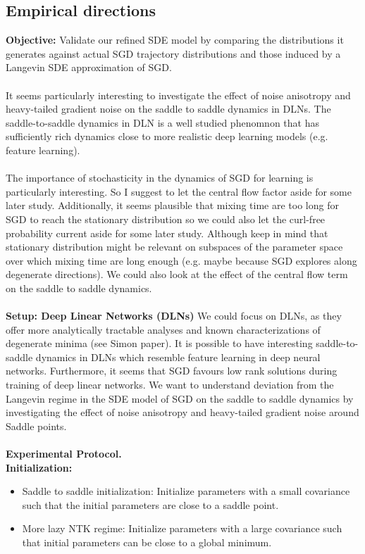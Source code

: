 \documentclass[11pt]{article}
\begin{document}
\subsection*{Empirical directions}
\textbf{Objective:} Validate our refined SDE model by comparing the distributions it generates against actual SGD trajectory distributions and those induced by a Langevin SDE approximation of SGD.
\\
\\
It seems particularly interesting to investigate the effect of noise anisotropy and heavy-tailed gradient noise on the saddle to saddle dynamics in DLNs. The saddle-to-saddle dynamics in DLN is a well studied phenomnon that has sufficiently rich dynamics close to more realistic deep learning models (e.g. feature learning).
\\
\\
The importance of stochasticity in the dynamics of SGD for learning is particularly interesting. So I suggest to let the central flow factor aside for some later study. Additionally, it seems plausible that mixing time are too long for SGD to reach the stationary distribution so we could also let the curl-free probability current aside for some later study. Although keep in mind that stationary distribution might be relevant on subspaces of the parameter space over which mixing time are long enough (e.g. maybe because SGD explores along degenerate directions). We could also look at the effect of the central flow term on the saddle to saddle dynamics.
\\
\\
\textbf{Setup: Deep Linear Networks (DLNs)}
We could focus on DLNs, as they offer more analytically tractable analyses and known characterizations of degenerate minima (see Simon paper). It is possible to have interesting saddle-to-saddle dynamics in DLNs which resemble feature learning in deep neural networks. Furthermore, it seems that SGD favours low rank solutions during training of deep linear networks. We want to understand deviation from the Langevin regime in the SDE model of SGD on the saddle to saddle dynamics by investigating the effect of noise anisotropy and heavy-tailed gradient noise around Saddle points.
\\
\\
\textbf{Experimental Protocol.}
\\
\textbf{Initialization:}
\begin{itemize}
\item Saddle to saddle initialization: Initialize parameters with a small covariance such that the initial parameters are close to a saddle point.
\item More lazy NTK regime: Initialize parameters with a large covariance such that initial parameters can be close to a global minimum.
\end{itemize}
\end{document}
